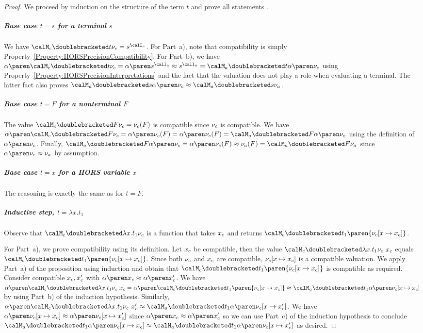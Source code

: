 \documentclass[../../diss.tex]{subfiles}
\begin{document}
\begin{proof}
    We proceed by induction on the structure of the term $t$ and prove all statements .

    \subparagraph{Base case $t = s$ for a terminal $s$}
    We have $\semc{t}{\valc} = s^{\interpretationa}$.
    For Part~a), note that compatibility is simply Property~\ref{Property:HORSPrecisionCompatibility}.
    For Part~b), we have $\abs{\semc{t}{\valc}} = \abs{s^{\interpretationa}} \approx s^{\interpretationa} = \sema{t}{\abs{\valc}}$ using Property~\ref{Property:HORSPrecisionInterpretations} and the fact that the valuation does not play a role when evaluating a terminal.
    The latter fact also proves $\sema{s}{\abs{\valc}} \approx \sema{s}{\vala}$.

    \subparagraph{Base case $t = F$ for a nonterminal $F$}
    The value $\semc{F}{\valc} = \valc(F)$ is compatible since $\nu_{c}$ is compatible.
    We have $\abs{\semc{F}{\valc}} = \abs{\valc(F)} = \abs{\valc}(F) = \sema{F}{\abs{\valc}}$ using the definition of $\abs{\valc}$.
    Finally, $\sema{F}{\abs{\valc}} = \abs{\valc}(F) \approx \vala(F) = \sema{F}{\vala}$ since $\abs{\valc} \approx \vala$ by assumption.


    \subparagraph{Base case $t = x$ for a HORS variable $x$}
    The reasoning is exactly the same as for $t = F$.

    \subparagraph{Inductive step, $t = \lambda x . t_1$}
    Observe that $\semc{\lambda x . t_1}{\valc}$ is a function that takes $x_c$ and returns $\semc{t_1}{\paren{\valc[x \mapsto \xc]}}$.

    For Part~a), we prove compatibility using its definition.
    Let $x_c$ be compatible, then the value $\semc{\lambda x . t_1}{\valc} \appl \xc$ equals $\semc{t_1}{\paren{\valc[x \mapsto \xc]}}$.
    Since both $\nu_{c}$ and $x_c$ are compatible, $\nu_{c}[x \mapsto x_c]$ is a compatible valuation.
    We apply Part~a) of the proposition using induction and obtain that $\semc{t_1}{\paren{\valc[x \mapsto \xc]}}$ is compatible as required.
    Consider compatible $x_c,x_c'$ with $\abs{\xc} \approx \abs{\xc'}$.
    We have $\abs{\semc{\lambda x . t_1}{\valc} \appl \xc} = \abs{\semc{t_1}{\paren{\valc[x \mapsto \xc]}}} \approx \sema{t_1}{\abs{\valc[x \mapsto \xc]}}$ by using Part~b) of the induction hypothesis.
    Similarly, $\abs{\semc{\lambda x . t_1}{\valc} \appl \xc'} \approx \sema{t_1}{\abs{\valc[x \mapsto \xc']}}$.
    We have $\abs{\valc[x \mapsto \xc]} \approx \abs{\valc[x \mapsto \xc']}$ since $\abs{\xc} \approx \abs{\xc'}$ so we can use Part~c) of the induction hypothesis to conclude $\sema{t_1}{\abs{\valc[x \mapsto \xc]}} \approx \sema{t_1}{\abs{\valc[x \mapsto \xc']}}$ as desired.


\end{proof}
\end{document}

